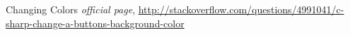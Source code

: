 \begin{thebibliography}{99999}
\singlespace\normalsize

 Changing Colors \textit{ official page}, \url{http://stackoverflow.com/questions/4991041/c-sharp-change-a-buttons-background-color}





\end{thebibliography}
